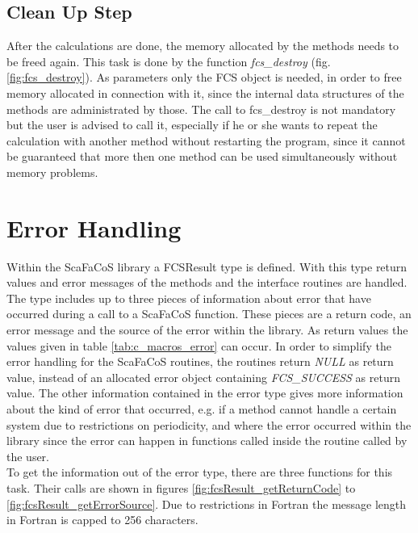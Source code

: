\subsection{Clean Up Step}
\label{sec:clean_up_step}



After the calculations are done, the memory allocated by the methods needs to be freed again. This task is done by the function \textit{fcs\_destroy} (fig. \ref{fig:fcs_destroy}).
As parameters only the FCS object is needed, in order to free memory allocated in connection with it, since the internal data structures of the methods are
administrated by those. The call to fcs\_destroy is not mandatory but the user is advised to call it, especially if he or she wants to repeat the calculation
with another method without restarting the program, since it cannot be guaranteed that more then one method can be used simultaneously without memory problems. 

\section{Error Handling}
\label{sec:error_handling}

Within the ScaFaCoS library a FCSResult type is defined. With this type return values and error messages of the methods and the interface routines are handled.
The type includes up to three pieces of information about error that have occurred during a call to a ScaFaCoS function. These pieces are a return code, an error
message and the source of the error within the library. As return values the values given in table \ref{tab:c_macros_error} can occur. In order to simplify the
error handling for the ScaFaCoS routines, the routines return \textit{NULL} as return value, instead of an allocated error object containing \textit{FCS\_SUCCESS}
as return value. The other information contained in the error type gives more information about the kind of error that occurred, e.g. if a method cannot handle
a certain system due to restrictions on periodicity, and where the error occurred within the library since the error can happen in functions called inside the
routine called by the user.\\
To get the information out of the error type, there are three functions for this task. Their calls are shown in figures \ref{fig:fcsResult_getReturnCode} to \ref{fig:fcsResult_getErrorSource}.
Due to restrictions in Fortran the message length in Fortran is capped to 256 characters.

